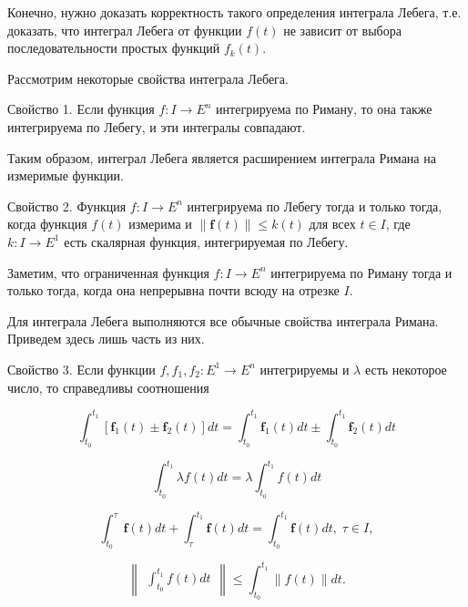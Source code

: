 \documentclass[8pt]{extarticle}
\begin{document}
Конечно, нужно доказать корректность такого определения интеграла Лебега, т.е. доказать, что интеграл Лебега от функции \(f\left( t\right)\) не зависит от выбора последовательности простых функций \({f}_{k}\left( t\right)\).

Рассмотрим некоторые свойства интеграла Лебега.

Свойство 1. Если функция \(f : I \rightarrow  {E}^{n}\) интегрируема по Риману, то она также интегрируема по Лебегу, и эти интегралы совпадают.

Таким образом, интеграл Лебега является расширением интеграла Римана на измеримые функции.

Свойство 2. Функция \(f : I \rightarrow  {E}^{n}\) интегрируема по Лебегу тогда и только тогда, когда функция \(f\left( t\right)\) измерима и \(\parallel \mathbf{f}\left( t\right) \parallel  \leq  k\left( t\right)\) для всех \(t \in  I\), где \(k : I \rightarrow  {E}^{1}\) есть скалярная функция, интегрируемая по Лебегу.

Заметим, что ограниченная функция \(f : I \rightarrow  {E}^{n}\) интегрируема по Риману тогда и только тогда, когда она непрерывна почти всюду на отрезке \(I\).

Для интеграла Лебега выполняются все обычные свойства интеграла Римана. Приведем здесь лишь часть из них.

Свойство 3. Если функции \(f,{f}_{1},{f}_{2} : {E}^{1} \rightarrow  {E}^{n}\) интегрируемы и \(\lambda\) есть некоторое число, то справедливы соотношения

\[
{\int }_{{t}_{0}}^{{t}_{1}}\left\lbrack  {{\mathbf{f}}_{1}\left( t\right)  \pm  {\mathbf{f}}_{2}\left( t\right) }\right\rbrack  {dt} = {\int }_{{t}_{0}}^{{t}_{1}}{\mathbf{f}}_{1}\left( t\right) {dt} \pm  {\int }_{{t}_{0}}^{{t}_{1}}{\mathbf{f}}_{2}\left( t\right) {dt}
\]

\[
{\int }_{{t}_{0}}^{{t}_{1}}{\lambda f}\left( t\right) {dt} = \lambda {\int }_{{t}_{0}}^{{t}_{1}}f\left( t\right) {dt}
\]

\[
{\int }_{{t}_{0}}^{\tau }\mathbf{f}\left( t\right) {dt} + {\int }_{\tau }^{{t}_{1}}\mathbf{f}\left( t\right) {dt} = {\int }_{{t}_{0}}^{{t}_{1}}\mathbf{f}\left( t\right) {dt},\;\tau  \in  I,
\]

\[
\left\lVert \begin{array}{c} {{\int }_{{t}_{0}}^{{t}_{1}}f\left( t\right) {dt}} \end{array} \right\rVert \leq  {\int }_{{t}_{0}}^{{t}_{1}}\parallel f\left( t\right) \parallel {dt}.
\]
\end{document}
